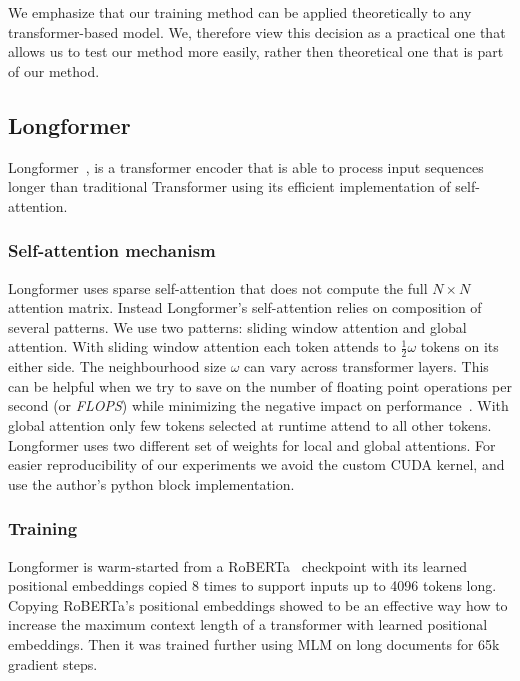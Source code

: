 We emphasize that our training method can be applied theoretically to any
transformer-based model. We, therefore view this decision as a practical one
that allows us to test our method more easily, rather then theoretical one that
is part of our method.

\subsection{Longformer}

Longformer~\citep{beltagy2020longformer}, is a transformer encoder that is able
to process input sequences longer than traditional Transformer using its
efficient implementation of self-attention.

\subsubsection{Self-attention mechanism}

Longformer uses sparse self-attention that does not compute the full $N \times
N$ attention matrix. Instead Longformer's self-attention relies on composition
of several patterns. We use two patterns: sliding window attention and global
attention. With sliding window attention each token attends to
$\frac{1}{2}\omega$ tokens on its either side. The neighbourhood size $\omega$
can vary across transformer layers. This can be helpful when we try to save on
the number of floating point operations per second (or \emph{FLOPS}) while
minimizing the negative impact on performance~\citep{sukhbaatar2019adaptive}.
With global attention only few tokens selected at runtime attend to all other
tokens. Longformer uses two different set of weights for local and global
attentions. For easier reproducibility of our experiments we avoid the custom
CUDA kernel, and use the author's python block implementation.

\subsubsection{Training}

Longformer is warm-started from a RoBERTa~\citep{liu2019roberta} checkpoint with
its learned positional embeddings copied 8 times to support inputs up to 4096
tokens long. Copying RoBERTa's positional embeddings showed to be an effective
way how to increase the maximum context length of a transformer with learned
positional embeddings. Then it was trained further using MLM on long documents
for 65k gradient steps.

